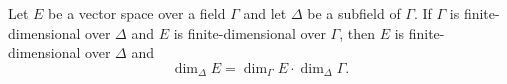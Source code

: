 Let $E$ be a vector space over a field $\Gamma$ and let $\Delta$ be a subfield of $\Gamma$. If $\Gamma$ is finite-dimensional over $\Delta$ and $E$ is finite-dimensional over $\Gamma$, then $E$ is finite-dimensional over $\Delta$ and
$$
\dim_{\Delta} E = \dim_{\Gamma} E \cdot \dim_{\Delta} \Gamma.
$$
